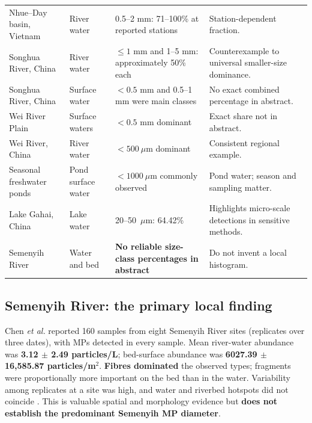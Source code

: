 \documentclass[10pt,a4paper]{article}
\begin{document}
\begin{longtable}{@{}p{2.75cm}p{2.15cm}p{6.1cm}p{3.35cm}@{}}
Nhue--Day basin, Vietnam \cite{Corpus06} & River water & 0.5--2 mm: 71--100\% at reported stations & Station-dependent fraction.\\
Songhua River, China \cite{Corpus10} & River water & $\leq 1$ mm and 1--5 mm: approximately 50\% each & Counterexample to universal smaller-size dominance.\\
Songhua River, China \cite{Corpus09} & Surface water & $<0.5$ mm and 0.5--1 mm were main classes & No exact combined percentage in abstract.\\
Wei River Plain \cite{Corpus14} & Surface waters & $<0.5$ mm dominant & Exact share not in abstract.\\
Wei River, China \cite{Corpus16} & River water & $<500~\mu$m dominant & Consistent regional example.\\
Seasonal freshwater ponds \cite{Corpus02} & Pond surface water & $<1000~\mu$m commonly observed & Pond water; season and sampling matter.\\
Lake Gahai, China \cite{Corpus03} & Lake water & 20--50~$\mu$m: 64.42\% & Highlights micro-scale detections in sensitive methods.\\
Semenyih River \cite{Corpus08} & Water and bed & \textbf{No reliable size-class percentages in abstract} & Do not invent a local histogram.\\
\bottomrule
\end{longtable}\normalsize

\subsection{Semenyih River: the primary local finding}
Chen \emph{et al.} reported 160 samples from eight Semenyih River sites (replicates over three dates), with MPs detected in every sample. Mean river-water abundance was \textbf{3.12 $\pm$ 2.49 particles/L}; bed-surface abundance was \textbf{6027.39 $\pm$ 16,585.87 particles/m$^2$}. \textbf{Fibres dominated} the observed types; fragments were proportionally more important on the bed than in the water. Variability among replicates at a site was high, and water and riverbed hotspots did not coincide \cite{Corpus08}. This is valuable spatial and morphology evidence but \textbf{does not establish the predominant Semenyih MP diameter}.
\end{document}
